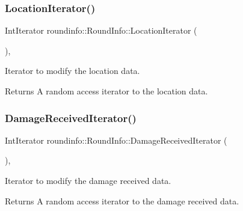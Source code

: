 \subsubsection{\texorpdfstring{Location\+Iterator()}{LocationIterator()}}
{\footnotesize\ttfamily Int\+Iterator roundinfo\+::\+Round\+Info\+::\+Location\+Iterator (\begin{DoxyParamCaption}{ }\end{DoxyParamCaption})\hspace{0.3cm}{\ttfamily [inline]}, {\ttfamily [noexcept]}}



Iterator to modify the location data. 

\begin{DoxyReturn}{Returns}
A random access iterator to the location data. 
\end{DoxyReturn}
\mbox{\label{classroundinfo_1_1_round_info_a94ea1a09ae7680e74188296aef0b0d63}} 
\subsubsection{\texorpdfstring{Damage\+Received\+Iterator()}{DamageReceivedIterator()}}
{\footnotesize\ttfamily Int\+Iterator roundinfo\+::\+Round\+Info\+::\+Damage\+Received\+Iterator (\begin{DoxyParamCaption}{ }\end{DoxyParamCaption})\hspace{0.3cm}{\ttfamily [inline]}, {\ttfamily [noexcept]}}



Iterator to modify the damage received data. 

\begin{DoxyReturn}{Returns}
A random access iterator to the damage received data. 
\end{DoxyReturn}
\mbox{\label{classroundinfo_1_1_round_info_a3a81f2d87bea27339f035201f1887423}} 
